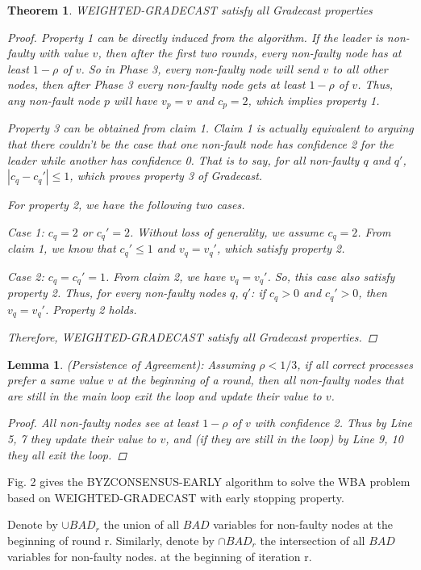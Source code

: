 \documentclass[conference]{IEEEtran}
\newtheorem{t1}{Theorem}
\newtheorem{l1}{Lemma}
\begin{document}
\begin{t1}
WEIGHTED-GRADECAST satisfy all Gradecast properties
\begin{proof}
Property 1 can be directly induced from the algorithm. If the leader is non-faulty with value $v$,  then after the first two rounds, every non-faulty node has at least $1 - \rho$ of $v$. So in Phase 3, every non-faulty node will send $v$ to all other nodes, then after Phase 3 every non-faulty node gets at least $1 - \rho$ of $v$. Thus, any non-fault node $p$ will have $v_p = v$ and $c_p = 2$, which implies property 1. 
 
Property 3 can be obtained from claim 1. Claim 1 is actually equivalent to arguing that there couldn't be the case that one non-fault node has confidence 2 for the leader while another has confidence 0. That is to say, for all non-faulty $q$ and $q'$, $|c_q - c_q'| \leq 1$, which proves property 3 of Gradecast.

For property 2, we have the following two cases. 

Case 1: $c_q = 2$ or $c_q' = 2$. Without loss of generality,  we assume $c_q = 2$. From claim 1, we know that $c_q' \leq 1$ and $v_q = v_q'$,  which satisfy property 2.

Case 2: $c_q = c_q' = 1$. From claim 2, we have $v_q = v_q'$. So, this case also satisfy property 2. 
Thus, for every non-faulty nodes $q$, $q'$: if $c_q > 0$ and $c_q' > 0$, then $v_q = v_q'$. Property 2 holds.

Therefore, \textit{WEIGHTED-GRADECAST} satisfy all Gradecast properties. 
\end{proof}
\end{t1}


\begin{l1}
(Persistence of Agreement): Assuming $\rho < 1/3$, if all correct processes  
prefer a same value $v$ at the beginning of a round, then all non-faulty nodes that are still in the main loop exit the loop and update their value to $v$. 
\begin{proof}
All non-faulty nodes see at least $1 - \rho$ of $v$ with confidence 2. Thus by Line 5, 7 they update their value to $v$, and (if they are still in the loop) by Line 9, 10 they all exit the loop.
\end{proof}
\end{l1}


Fig. 2 gives the BYZCONSENSUS-EARLY algorithm to solve the WBA problem based on WEIGHTED-GRADECAST with early stopping property. 

Denote by $\cup BAD_r$ the union of all $BAD$ variables for non-faulty nodes at the beginning of round r. Similarly, denote by $\cap BAD_r$ the intersection of all $BAD$ variables for non-faulty nodes.
at the beginning of iteration r.
\end{document}
